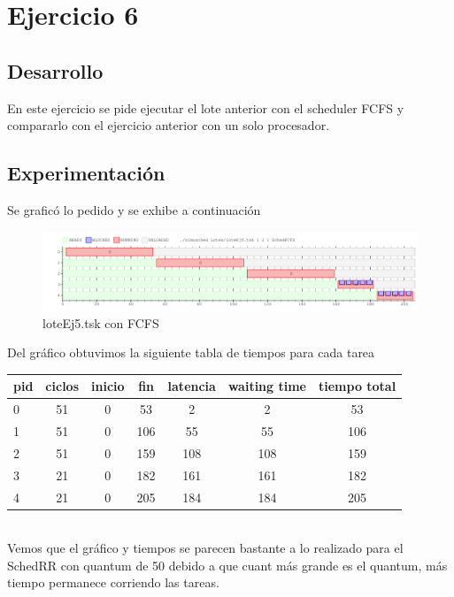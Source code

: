 \section{Ejercicio 6}


\subsection{Desarrollo}
En este ejercicio se pide ejecutar el lote anterior con el scheduler FCFS
y compararlo con el ejercicio anterior con un solo procesador.


\subsection{Experimentación}
Se graficó lo pedido y se exhibe a continuación
\begin{figure}[H]
  \centering
    \includegraphics[width=1.1\textwidth]{imagenes/Ej6.png}
  \caption{loteEj5.tsk con FCFS}
\end{figure}

Del gráfico obtuvimos la siguiente tabla de tiempos para cada tarea\\

\begin{tabular}{ l | c | c | c | c | c | c | }
  \hline			
  pid & ciclos & inicio & fin & latencia & waiting time & tiempo total  \\
  \hline
0 & 51 & 0 & 53 & 2 & 2 & 53\\
1 & 51 & 0 & 106 & 55 & 55 & 106\\
2 & 51 & 0 & 159 & 108 & 108 & 159\\
3 & 21 & 0 & 182 & 161 & 161 & 182\\
4 & 21 & 0 & 205 & 184 & 184 & 205\\
\hline
\end{tabular}\\

Vemos que el gráfico y tiempos se parecen bastante a lo realizado para el SchedRR con quantum de 50 debido a que cuant más grande es el quantum, más tiempo permanece corriendo las tareas.